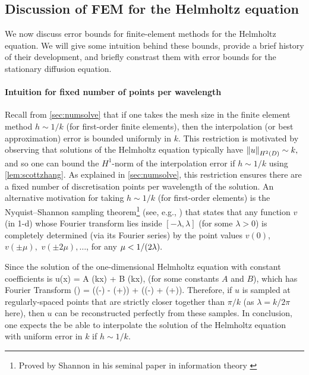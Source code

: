 \subsection{Discussion of FEM for the Helmholtz equation}\label{sec:helmfedisc}

We now discuss error bounds for finite-element methods for the Helmholtz equation. We will give some intuition behind these bounds, provide a brief history of their development, and briefly constrast them with error bounds for the stationary diffusion equation.

\paragraph{Intuition for fixed number of points per wavelength} Recall from \cref{sec:numsolve} that if one takes the mesh size in the finite element method $h \sim 1/k$ (for first-order finite elements), then the interpolation (or best approximation) error is bounded uniformly in $k$. This restriction is motivated by observing that solutions of the Helmholtz equation typically have $\NHtD{u} \sim k,$ and so one can bound the $H^1$-norm of the interpolation error if $h \sim 1/k$ using \cref{lem:scottzhang}.  As explained in \cref{sec:numsolve}, this restriction ensures there are a fixed number of discretisation points per wavelength of the solution. An alternative motivation for taking $h \sim 1/k$ (for first-order elements) is the Nyquist--Shannon sampling theorem\footnote{Proved by Shannon in his seminal paper in information theory \cite[Theorem 1]{Sh:49}} (see, e.g., \cite[\S 5.21]{BaNaBe:00}) that states that any function $v$ (in 1-d) whose Fourier transform lies inside $[-\lambda,\lambda]$ (for some $\lambda >0$) is completely determined (via its Fourier series) by the point values $v(0)$, $v(\pm \mu),$ $v(\pm2\mu),  \ldots$, for any $\mu < 1/\mleft(2\lambda\mright).$

Since the solution of the one-dimensional Helmholtz equation with constant coefficients is
\beq\label{eq:hh-1d}
u(x) = A \sin(kx) + B \cos(kx),
\eeq
(for some constants $A$ and $B$), which has Fourier Transform
\beqs
\uhat(\xi) =  \mleft(\delta\mleft(\xi-\mright) - \delta\mleft(\xi+\mright)\mright) +  \mleft(\delta\mleft(\xi-\mright) + \delta\mleft(\xi+\mright)\mright).
\eeqs
{}
Therefore, if $u$ is sampled at regularly-spaced points that are strictly closer together than $\pi/k$ (as $\lambda = k/2\pi$ here), then $u$ can be reconstructed perfectly from these samples. In conclusion, one expects the be able to interpolate the solution of the Helmholtz equation with uniform error in $k$ if $h \sim 1/k.$

